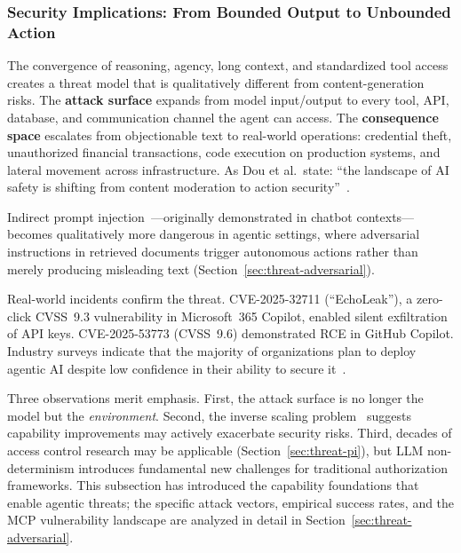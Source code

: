 \subsubsection{Security Implications: From Bounded Output to Unbounded Action}
\label{sec:cap-implications}

The convergence of reasoning, agency, long context, and standardized tool access creates a threat model that is qualitatively different from content-generation risks. The \textbf{attack surface} expands from model input/output to every tool, API, database, and communication channel the agent can access. The \textbf{consequence space} escalates from objectionable text to real-world operations: credential theft, unauthorized financial transactions, code execution on production systems, and lateral movement across infrastructure. As Dou et al.\ state: ``the landscape of AI safety is shifting from content moderation to action security''~\cite{dou2026ajar}.

Indirect prompt injection~\cite{greshake2023ipi}---originally demonstrated in chatbot contexts---becomes qualitatively more dangerous in agentic settings, where adversarial instructions in retrieved documents trigger autonomous actions rather than merely producing misleading text (Section~\ref{sec:threat-adversarial}).

Real-world incidents confirm the threat. CVE-2025-32711 (``EchoLeak''), a zero-click CVSS~9.3 vulnerability in Microsoft~365 Copilot, enabled silent exfiltration of API keys. CVE-2025-53773 (CVSS~9.6) demonstrated RCE in GitHub Copilot. Industry surveys indicate that the majority of organizations plan to deploy agentic AI despite low confidence in their ability to secure it~\cite{cisco2026aisecurity}.

Three observations merit emphasis. First, the attack surface is no longer the model but the \emph{environment}. Second, the inverse scaling problem~\cite{wang2025mcptox} suggests capability improvements may actively exacerbate security risks. Third, decades of access control research may be applicable (Section~\ref{sec:threat-pi}), but LLM non-determinism introduces fundamental new challenges for traditional authorization frameworks. This subsection has introduced the capability foundations that enable agentic threats; the specific attack vectors, empirical success rates, and the MCP vulnerability landscape are analyzed in detail in Section~\ref{sec:threat-adversarial}.


